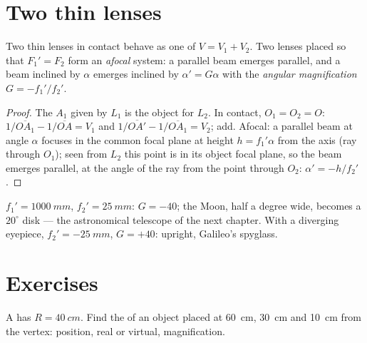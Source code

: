 \section{Two thin lenses}

\begin{proposition}\label{prop:b1:mirrors-thin-lenses:doublet}
Two thin lenses in contact behave as one  of 
$V = V_1 + V_2$. Two lenses placed so that $F_1' = F_2$ form an
\emph{afocal} system: a parallel beam emerges parallel, and a beam
inclined by $\alpha$ emerges inclined by $\alpha' = G\alpha$ with the
\emph{angular magnification} $G = -f_1'/f_2'$.
\end{proposition}

\begin{proof}
The  $A_1$ given by $L_1$ is the object for $L_2$. In contact,
$O_1 = O_2 = O$: $1/\overline{OA_1} - 1/\overline{OA} = V_1$ and
$1/\overline{OA'} - 1/\overline{OA_1} = V_2$; add. Afocal: a parallel
beam at angle $\alpha$ focuses in the common focal plane at height
$h = f_1'\alpha$ from the axis (ray through $O_1$); seen from $L_2$ this
point is in its object focal plane, so the beam emerges parallel, at the
angle of the ray from the point through $O_2$: $\alpha' = -h/f_2'$.
\end{proof}

\begin{example}\label{ex:b1:mirrors-thin-lenses:afocal}
$f_1' = \qty{1000}{mm}$, $f_2' = \qty{25}{mm}$: $G = -40$; the Moon,
half a degree wide, becomes a $20^\circ$ disk --- the astronomical
telescope of the next chapter. With a diverging eyepiece,
$f_2' = \qty{-25}{mm}$, $G = +40$: upright, Galileo's spyglass.
\end{example}

\section{Exercises}

\begin{exercise}[$\star$]\label{exo:b1:mirrors-thin-lenses:1}
A  has $R = \qty{40}{cm}$. Find the  of an object
placed at \qty{60}{cm}, \qty{30}{cm} and \qty{10}{cm} from the vertex:
position, real or virtual, magnification.
\end{exercise}

